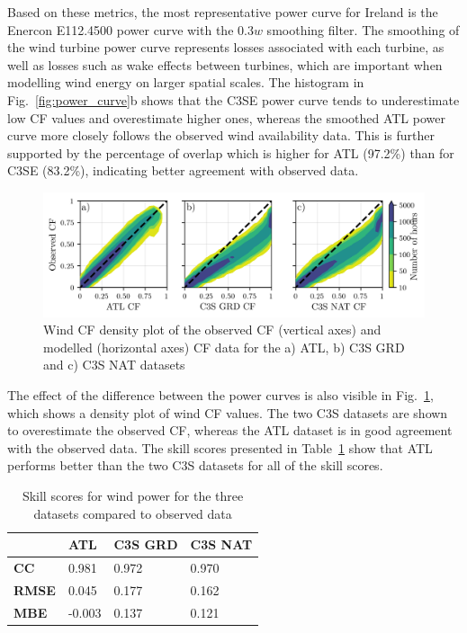 \documentclass[preprint, 12pt]{elsarticle}
\begin{document}
Based on these metrics, the most representative power curve for Ireland is the Enercon E112.4500 power curve with the $0.3w$ smoothing filter. The smoothing of the wind turbine power curve represents losses associated with each turbine, as well as losses such as wake effects between turbines, which are important when modelling wind energy on larger spatial scales. The histogram in Fig.~\ref{fig:power_curve}b shows that the C3SE power curve tends to underestimate low CF values and overestimate higher ones, whereas the smoothed ATL power curve more closely follows the observed wind availability data. This is further supported by the percentage of overlap which is higher for ATL (97.2\%) than for C3SE (83.2\%), indicating better agreement with observed data.

\begin{figure}[!ht]
	\centering
	\includegraphics[width=\textwidth]{verification_wind_contour.png}
	\caption{Wind CF density plot of the observed CF (vertical axes) and modelled (horizontal axes) CF data for the a) ATL, b) C3S GRD and c) C3S NAT datasets}
	\label{fig:wind_verification_contour}
\end{figure}

The effect of the difference between the power curves is also visible in Fig.~\ref{fig:wind_verification_contour}, which shows a density plot of wind CF values. The two C3S datasets are shown to overestimate the observed CF, whereas the ATL dataset is in good agreement with the observed data. The skill scores presented in Table~\ref{tab:wind_skill_scores} show that ATL performs better than the two C3S datasets for all of the skill scores. 

\begin{table}[!ht]
	\centering
	\begin{tabular}{l|lll|}
		\cline{2-4}
		& \textbf{ATL} & \textbf{C3S GRD} & \textbf{C3S NAT} \\ \hline
		\multicolumn{1}{|l|}{\textbf{CC}}   & 0.981           & 0.972            & 0.970            \\ \hline
		\multicolumn{1}{|l|}{\textbf{RMSE}} & 0.045           & 0.177            & 0.162            \\ \hline
		\multicolumn{1}{|l|}{\textbf{MBE}}   & -0.003          & 0.137            & 0.121            \\ \hline
	\end{tabular}
	\caption{Skill scores for wind power for the three datasets compared to observed data}
	\label{tab:wind_skill_scores}
\end{table}
\end{document}
